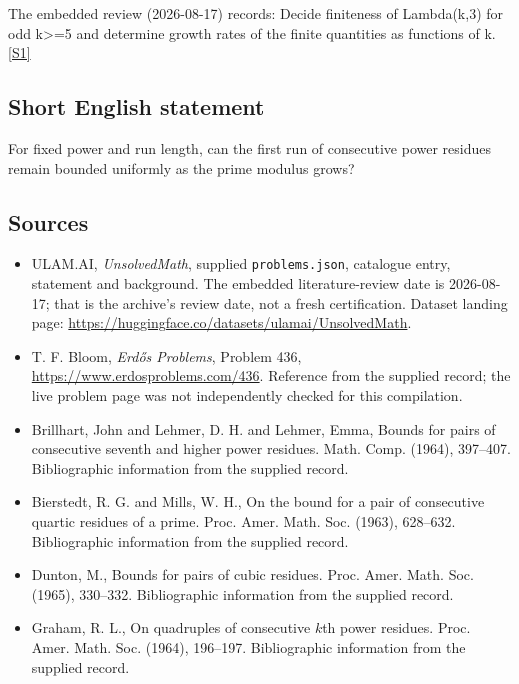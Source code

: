 \documentclass[11pt,a4paper]{article}
\newcommand{\sref}[2]{\hyperlink{source:#1:#2}{[S#2]}}
\begin{document}
The embedded review (2026-08-17) records: Decide finiteness of Lambda(k,3) for odd k>=5 and determine growth rates of the finite quantities as functions of k. \sref{statement}{1}

\subsection{Short English statement}

For fixed power and run length, can the first run of consecutive power residues remain bounded uniformly as the prime modulus grows?

\subsection{Sources}

{\small

\begin{itemize}

\item[\hypertarget{source:statement:1}{S1}] ULAM.AI, \emph{UnsolvedMath}, supplied \texttt{problems.json}, catalogue entry, statement and background. The embedded literature-review date is 2026-08-17; that is the archive’s review date, not a fresh certification. Dataset landing page: \url{https://huggingface.co/datasets/ulamai/UnsolvedMath}.

\item[\hypertarget{source:statement:2}{S2}] T. F. Bloom, \emph{Erdős Problems}, Problem 436, \url{https://www.erdosproblems.com/436}. Reference from the supplied record; the live problem page was not independently checked for this compilation.

\item[\hypertarget{source:statement:3}{S3}] Brillhart, John and Lehmer, D. H. and Lehmer, Emma, Bounds for pairs of consecutive seventh and higher power residues. Math. Comp. (1964), 397--407. Bibliographic information from the supplied record.

\item[\hypertarget{source:statement:4}{S4}] Bierstedt, R. G. and Mills, W. H., On the bound for a pair of consecutive quartic residues of a prime. Proc. Amer. Math. Soc. (1963), 628--632. Bibliographic information from the supplied record.

\item[\hypertarget{source:statement:5}{S5}] Dunton, M., Bounds for pairs of cubic residues. Proc. Amer. Math. Soc. (1965), 330--332. Bibliographic information from the supplied record.

\item[\hypertarget{source:statement:6}{S6}] Graham, R. L., On quadruples of consecutive {$k$}th power residues. Proc. Amer. Math. Soc. (1964), 196--197. Bibliographic information from the supplied record.

\end{itemize}

}

\label{end:statement}
\end{document}
